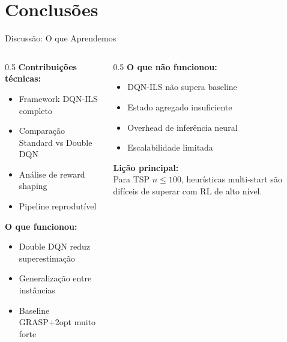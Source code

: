 \documentclass[11pt, xcolor=dvipsnames]{beamer}
\begin{document}
\section{Conclusões}

\begin{frame}{Discussão: O que Aprendemos}
  \footnotesize
  \begin{columns}[T]
    \begin{column}{0.5\textwidth}
      \textbf{Contribuições técnicas:}
      \begin{itemize}
        \item Framework DQN-ILS completo
        \item Comparação Standard vs Double DQN
        \item Análise de reward shaping
        \item Pipeline reprodutível
      \end{itemize}
      \vspace{2mm}
      \textbf{O que funcionou:}
      \begin{itemize}
        \item Double DQN reduz superestimação
        \item Generalização entre instâncias
        \item Baseline GRASP+2opt muito forte
      \end{itemize}
    \end{column}
    \begin{column}{0.5\textwidth}
      \textbf{O que não funcionou:}
      \begin{itemize}
        \item DQN-ILS não supera baseline
        \item Estado agregado insuficiente
        \item Overhead de inferência neural
        \item Escalabilidade limitada
      \end{itemize}
      \vspace{2mm}
      \begin{alertbox}
        {\scriptsize
        \textbf{Lição principal:} \\
        Para TSP $n \leq 100$, heurísticas multi-start são difíceis de superar com RL de alto nível.
        }
      \end{alertbox}
    \end{column}
  \end{columns}
\end{frame}
\end{document}
